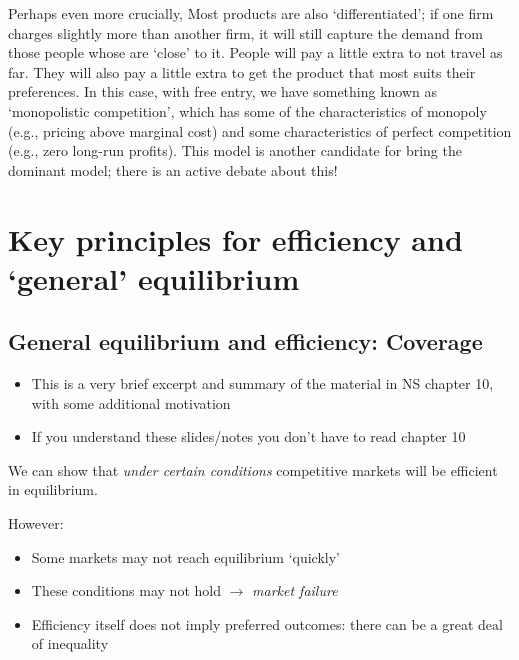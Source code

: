 \documentclass[]{article}
\providecommand{\tightlist}{%
  \setlength{\itemsep}{0pt}\setlength{\parskip}{0pt}}
\begin{document}
Perhaps even more crucially, Most products are also `differentiated'; if one firm charges slightly more than another firm, it will still capture the demand from those people whose are `close' to it. People will pay a little extra to not travel as far. They will also pay a little extra to get the product that most suits their preferences. In this case, with free entry, we have something known as `monopolistic competition', which has some of the characteristics of monopoly (e.g., pricing above marginal cost) and some characteristics of perfect competition (e.g., zero long-run profits). This model is another candidate for bring the dominant model; there is an active debate about this!

\bigskip

\hypertarget{key-principles-for-efficiency-and-general-equilibrium}{%
\section{Key principles for efficiency and `general' equilibrium}\label{key-principles-for-efficiency-and-general-equilibrium}}

\hypertarget{general-equilibrium-and-efficiency-coverage}{%
\subsection{General equilibrium and efficiency: Coverage}\label{general-equilibrium-and-efficiency-coverage}}

\begin{itemize}
\tightlist
\item
  This is a very brief excerpt and summary of the material in NS chapter 10, with some additional motivation
\item
  If you understand these slides/notes you don't have to read chapter 10
\end{itemize}

We can show that \emph{under certain conditions} competitive markets will be efficient in equilibrium.

However:

\begin{itemize}
\item
  Some markets may not reach equilibrium `quickly'
\item
  These conditions may not hold \(\rightarrow\) \emph{market failure}
\item
  Efficiency itself does not imply preferred outcomes: there can be a great deal of inequality
\end{itemize}
\end{document}
